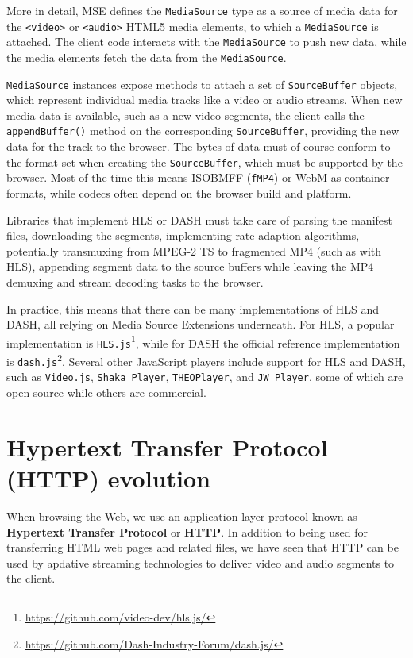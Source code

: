 More in detail, MSE defines the \texttt{MediaSource} type as a source of media data for the \texttt{<video>} or \texttt{<audio>} HTML5 media elements, to which a \texttt{MediaSource} is attached. The client code interacts with the \texttt{MediaSource} to push new data, while the media elements fetch the data from the \texttt{MediaSource}.

\texttt{MediaSource} instances expose methods to attach a set of \texttt{SourceBuffer} objects, which represent individual media tracks like a video or audio streams. When new media data is available, such as a new video segments, the client calls the \texttt{appendBuffer()} method on the corresponding \texttt{SourceBuffer}, providing the new data for the track to the browser. The bytes of data must of course conform to the format set when creating the \texttt{SourceBuffer}, which must be supported by the browser. Most of the time this means ISOBMFF (\texttt{fMP4}) or WebM as container formats, while codecs often depend on the browser build and platform.

Libraries that implement HLS or DASH must take care of parsing the manifest files, downloading the segments, implementing rate adaption algorithms, potentially transmuxing from MPEG-2 TS to fragmented MP4 (such as with HLS), appending segment data to the source buffers while leaving the MP4 demuxing and stream decoding tasks to the browser.

In practice, this means that there can be many implementations of HLS and DASH, all relying on Media Source Extensions underneath. For HLS, a popular implementation is \texttt{HLS.js}\footnote{\url{https://github.com/video-dev/hls.js/}}, while for DASH the official reference implementation is \texttt{dash.js}\footnote{\url{https://github.com/Dash-Industry-Forum/dash.js/}}. Several other JavaScript players include support for HLS and DASH, such as \texttt{Video.js}, \texttt{Shaka Player}, \texttt{THEOPlayer}, and \texttt{JW Player}, some of which are open source while others are commercial.

\section{Hypertext Transfer Protocol (HTTP) evolution}
\label{sec:bg/http}

When browsing the Web, we use an application layer protocol known as \textbf{Hypertext Transfer Protocol} or \textbf{HTTP}. In addition to being used for transferring HTML web pages and related files, we have seen that HTTP can be used by apdative streaming technologies to deliver video and audio segments to the client.


